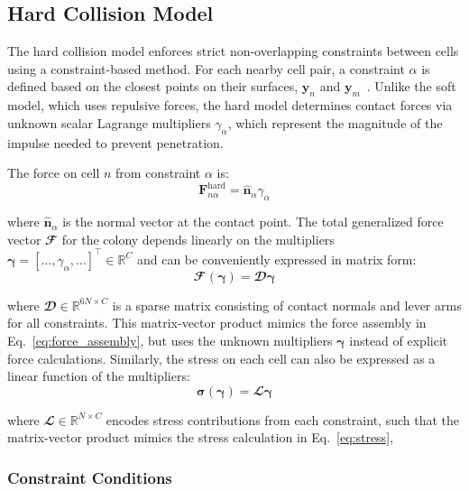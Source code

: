 \documentclass[conference]{IEEEtran}
\begin{document}
\subsection{Hard Collision Model}

The hard collision model enforces strict non-overlapping constraints between cells using a constraint-based method. For each nearby cell pair, a constraint $\alpha$ is defined based on the closest points on their surfaces, $\mathbf{y}_n$ and $\mathbf{y}_m$~\cite{Weady2024SM}. Unlike the soft model, which uses repulsive forces, the hard model determines contact forces via unknown scalar Lagrange multipliers $\gamma_\alpha$, which represent the magnitude of the impulse needed to prevent penetration.

The force on cell $n$ from constraint $\alpha$ is:
\begin{equation} \label{eq:constraint_force}
    \mathbf{F}^{\text{hard}}_{n\alpha} = \hat{\mathbf{n}}_\alpha \gamma_\alpha
\end{equation}

where $\hat{\mathbf{n}}_\alpha$ is the normal vector at the contact point. The total generalized force vector $\mathbfcal{F}$ for the colony depends linearly on the multipliers $\boldsymbol{\gamma} = [\dots, \gamma_\alpha, \dots]^\top \in \mathbb{R}^{C}$ and can be conveniently expressed in matrix form:
\begin{equation} \label{eq:force_as_function_of_multipliers}
    \mathbfcal{F}(\boldsymbol{\gamma}) = \mathbfcal{D} \boldsymbol{\gamma}
\end{equation}

where $\mathbfcal{D} \in \mathbb{R}^{6N \times C}$ is a sparse matrix consisting of contact normals and lever arms for all constraints. This matrix-vector product mimics the force assembly in Eq.~\ref{eq:force_assembly}, but uses the unknown multipliers $\boldsymbol{\gamma}$ instead of explicit force calculations. Similarly, the stress on each cell can also be expressed as a linear function of the multipliers:
\begin{equation} \label{eq:stress_as_function_of_multipliers}
    \boldsymbol{\sigma}(\boldsymbol{\gamma}) = \mathbfcal{L} \boldsymbol{\gamma}
\end{equation}

where $\mathbfcal{L} \in \mathbb{R}^{N \times C}$ encodes stress contributions from each constraint, such that the matrix-vector product mimics the stress calculation in Eq.~\ref{eq:stress},

\subsubsection{Constraint Conditions}
\end{document}
